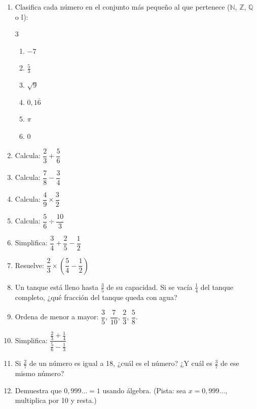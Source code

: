 \documentclass[12pt, letterpaper]{article}
\begin{document}
\begin{enumerate}[leftmargin=*]
  \item \facil{} Clasifica cada número en el conjunto más pequeño al que pertenece ($\mathbb{N}$, $\mathbb{Z}$, $\mathbb{Q}$ o $\mathbb{I}$):
        \begin{multicols}{3}
          \begin{enumerate}[label=\alph*)]
            \item $-7$
            \item $\frac{5}{3}$
            \item $\sqrt{9}$
            \item $0{,}1\overline{6}$
            \item $\pi$
            \item $0$
          \end{enumerate}
        \end{multicols}

  \item \facil{} Calcula: $\dfrac{2}{3} + \dfrac{5}{6}$

  \item \facil{} Calcula: $\dfrac{7}{8} - \dfrac{3}{4}$

  \item \facil{} Calcula: $\dfrac{4}{9} \times \dfrac{3}{2}$

  \item \facil{} Calcula: $\dfrac{5}{6} \div \dfrac{10}{3}$

  \item \medio{} Simplifica: $\dfrac{3}{4} + \dfrac{2}{5} - \dfrac{1}{2}$

  \item \medio{} Resuelve: $\dfrac{2}{3} \times \left(\dfrac{5}{4} - \dfrac{1}{2}\right)$

  \item \medio{} Un tanque está lleno hasta $\frac{3}{5}$ de su capacidad. Si se vacía $\frac{1}{4}$ del tanque completo, ¿qué fracción del tanque queda con agua?

  \item \medio{} Ordena de menor a mayor: $\dfrac{3}{5}$, $\dfrac{7}{10}$, $\dfrac{2}{3}$, $\dfrac{5}{8}$.

  \item \dificil{} Simplifica: $\dfrac{\frac{2}{3} + \frac{1}{4}}{\frac{5}{6} - \frac{1}{3}}$

  \item \dificil{} Si $\frac{2}{7}$ de un número es igual a 18, ¿cuál es el número? ¿Y cuál es $\frac{3}{7}$ de ese mismo número?

  \item \dificil{} Demuestra que $0{,}999\ldots = 1$ usando álgebra. (Pista: sea $x = 0{,}999\ldots$, multiplica por 10 y resta.)
\end{enumerate}
\end{document}
